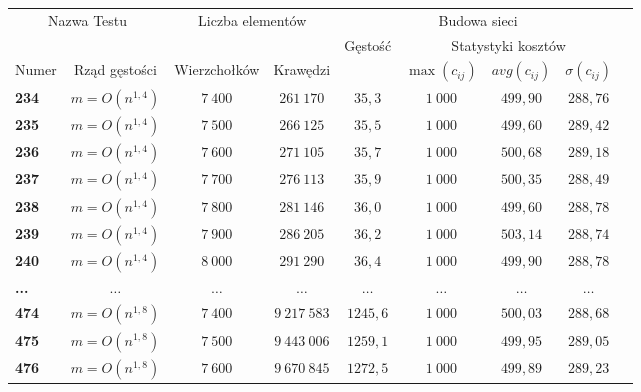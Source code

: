 \begin{table}[h]
	\centering
	\begin{tabular}{lcccccccc}
		\hline
		\multicolumn{2}{c|}{\multirow{2}{*}{Nazwa Testu}} & \multicolumn{2}{c|}{\multirow{2}{*}{Liczba elementów}} & \multicolumn{4}{c}{Budowa sieci} &  \\ \cline{5-9}
		\multicolumn{2}{l|}{} & \multicolumn{2}{c|}{} & \multirow{2}{*}{Gęstość} & \multicolumn{3}{|c}{Statystyki kosztów} &  \\ \cline{1-4} \cline{6-9}
		\multicolumn{1}{l|}{Numer} & \multicolumn{1}{c|}{Rząd gęstości} & \multicolumn{1}{c|}{Wierzchołków} & \multicolumn{1}{c|}{Krawędzi} & & \multicolumn{1}{|c}{$\max \left( c_{ij} \right) $} & \multicolumn{1}{|c}{$ avg \left( c_{ij} \right) $} & \multicolumn{1}{|c}{$\sigma \left( c_{ij} \right) $} &  \\
		\hline
		\textbf{234} & $ m = O \left( n^{1,4} \right) $ & $7~400$ & $261~170$ & $35,3$ & $1~000$ & $499,90$ & $288,76$ &  \\
		\textbf{235} & $ m = O \left( n^{1,4} \right) $ & $7~500$ & $266~125$ & $35,5$ & $1~000$ & $499,60$ & $289,42$ &  \\
		\textbf{236} & $ m = O \left( n^{1,4} \right) $ & $7~600$ & $271~105$ & $35,7$ & $1~000$ & $500,68$ & $289,18$ &  \\
		\textbf{237} & $ m = O \left( n^{1,4} \right) $ & $7~700$ & $276~113$ & $35,9$ & $1~000$ & $500,35$ & $288,49$ &  \\
		\textbf{238} & $ m = O \left( n^{1,4} \right) $ & $7~800$ & $281~146$ & $36,0$ & $1~000$ & $499,60$ & $288,78$ &  \\
		\textbf{239} & $ m = O \left( n^{1,4} \right) $ & $7~900$ & $286~205$ & $36,2$ & $1~000$ & $503,14$ & $288,74$ &  \\
		\textbf{240} & $ m = O \left( n^{1,4} \right) $ & $8~000$ & $291~290$ & $36,4$ & $1~000$ & $499,90$ & $288,78$ &  \\
		\textbf{...} & $ \dots $ & $ \dots $ & $ \dots $ & $ \dots $ & $ \dots $ & $ \dots $ & $ \dots $ &  \\
		\textbf{474} & $ m = O \left( n^{1,8} \right) $ & $7~400$ & $9~217~583$ & $1245,6$ & $1~000$ & $500,03$ & $288,68$ &  \\
		\textbf{475} & $ m = O \left( n^{1,8} \right) $ & $7~500$ & $9~443~006$ & $1259,1$ & $1~000$ & $499,95$ & $289,05$ &  \\
		\textbf{476} & $ m = O \left( n^{1,8} \right) $ & $7~600$ & $9~670~845$ & $1272,5$ & $1~000$ & $499,89$ & $289,23$ &  \\

\end{tabular}
\end{table}
